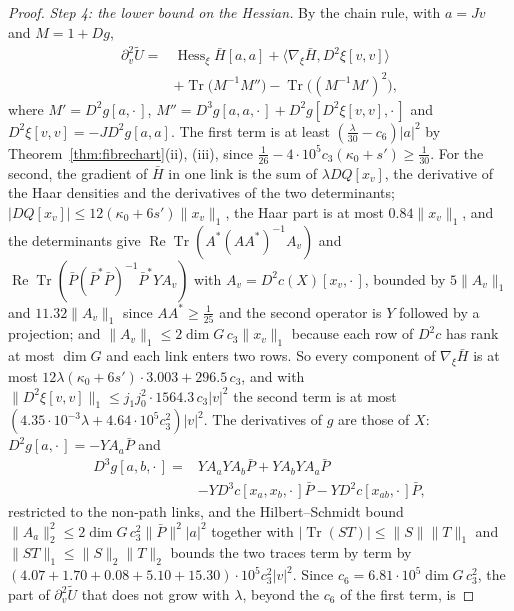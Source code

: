 \documentclass[11pt]{amsart}
\theoremstyle{definition}
\theoremstyle{remark}
\numberwithin{equation}{section}
\begin{document}
\begin{proof}
\emph{Step 4: the lower bound on the Hessian.} By the chain rule, with
$a=Jv$ and $M=1+Dg$,
\[
\begin{split}
\partial_v^2\tilde U={}&\operatorname{Hess}_\xi\bar H[a,a]+\bigl\langle
\nabla_\xi\bar H,D^2\xi[v,v]\bigr\rangle\\
&+\operatorname{Tr}\bigl(M^{-1}M''\bigr)-\operatorname{Tr}\bigl((M^{-1}
M')^2\bigr),
\end{split}
\]
where $M'=D^2g[a,\cdot\,]$, $M''=D^3g[a,a,\cdot\,]+D^2g[D^2\xi[v,v],\cdot\,]$
and $D^2\xi[v,v]=-JD^2g[a,a]$. The first term is at least
$(\frac\lambda{30}-c_6)\lvert a\rvert^2$ by
Theorem~\ref{thm:fibrechart}(ii), (iii), since
$\frac1{26}-4\cdot10^5c_3(\kappa_0+s')\ge\frac1{30}$. For the second, the
gradient of $\bar H$ in one link is the sum of $\lambda DQ[x_v]$, the
derivative of the Haar densities and the derivatives of the two
determinants; $\lvert DQ[x_v]\rvert\le12(\kappa_0+6s')\lVert x_v\rVert_1$,
the Haar part is at most $0.84\lVert x_v\rVert_1$, and the determinants
give $\operatorname{Re}\operatorname{Tr}(A^*(AA^*)^{-1}A_v)$ and
$\operatorname{Re}\operatorname{Tr}(\bar P(\bar P^*\bar P)^{-1}\bar P^*
YA_v)$ with $A_v=D^2c(X)[x_v,\cdot\,]$, bounded by $5\lVert A_v\rVert_1$ and
$11.32\lVert A_v\rVert_1$ since $AA^*\ge\frac1{25}$ and the second operator
is $Y$ followed by a projection; and $\lVert A_v\rVert_1\le2\dim G\,c_3
\lVert x_v\rVert_1$ because each row of $D^2c$ has rank at most $\dim G$
and each link enters two rows. So every component of $\nabla_\xi\bar H$
is at most $12\lambda(\kappa_0+6s')\cdot3.003+296.5\,c_3$, and with
$\lVert D^2\xi[v,v]\rVert_1\le j_1j_0^2\cdot1564.3\,c_3\lvert v\rvert^2$ the
second term is at most $(4.35\cdot10^{-3}\lambda+4.64\cdot10^5c_3^2)
\lvert v\rvert^2$. The derivatives of $g$ are those of $X$:
$D^2g[a,\cdot\,]=-YA_a\bar P$ and
\[
\begin{split}
D^3g[a,b,\cdot\,]={}&YA_aYA_b\bar P+YA_bYA_a\bar P\\
&-YD^3c[x_a,x_b,\cdot\,]\bar P-YD^2c[x_{ab},\cdot\,]\bar P,
\end{split}
\]
restricted to the non-path links, and the Hilbert--Schmidt bound
$\lVert A_a\rVert_2^2\le2\dim G\,c_3^2\lVert\bar P\rVert^2\lvert a\rvert^2$
together with $\lvert\operatorname{Tr}(ST)\rvert\le\lVert S\rVert
\lVert T\rVert_1$ and $\lVert ST\rVert_1\le\lVert S\rVert_2\lVert T
\rVert_2$ bounds the two traces term by term by
$(4.07+1.70+0.08+5.10+15.30)\cdot10^5c_3^2\lvert v\rvert^2$. Since
$c_6=6.81\cdot10^5\dim G\,c_3^2$, the part of $\partial_v^2\tilde U$
that does not grow with $\lambda$, beyond the $c_6$ of the first term, is

\end{proof}
\end{document}
